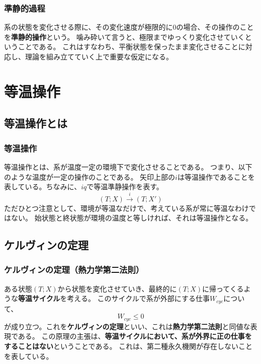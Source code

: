 \documentclass[a4paper]{jsreport}
\begin{document}
            \subsection*{準静的過程}   
                系の状態を変化させる際に、その変化速度が極限的に$0$の場合、その操作のことを\textbf{準静的操作}という。
                噛み砕いて言うと、極限までゆっくり変化させていくということである。
                これはすなわち、平衡状態を保ったまま変化させることに対応し、理論を組み立てていく上で重要な仮定になる。

    \chapter{等温操作}

        \section{等温操作とは}
            \subsection*{等温操作}
                等温操作とは、系が温度一定の環境下で変化させることである。
                つまり、以下のような温度が一定の操作のことである。
                矢印上部の$i$は等温操作であることを表している。ちなみに、$iq$で等温準静操作を表す。
                \begin{equation}
                    (T; X)\xrightarrow{i}(T; X')
                \end{equation}
                ただひとつ注意として、環境が等温なだけで、考えている系が常に等温なわけではない。
                始状態と終状態が環境の温度と等しければ、それは等温操作となる。
                
        \section{ケルヴィンの定理}
                               
            \subsection*{ケルヴィンの定理（熱力学第二法則）}
                ある状態$(T; X)$から状態を変化させていき、最終的に$(T; X)$に帰ってくるような\textbf{等温サイクル}を考える。
                このサイクルで系が外部にする仕事$W_{cyc}$について、
                \begin{equation}
                    W_{cyc} \le 0
                \end{equation}
                が成り立つ。これを\textbf{ケルヴィンの定理}といい、これは\textbf{熱力学第二法則}と同値な表現である。
                この原理の主張は、\textbf{等温サイクルにおいて、系が外界に正の仕事をすることはない}ということである。
                これは、第二種永久機関が存在しないことを表している。
\end{document}
